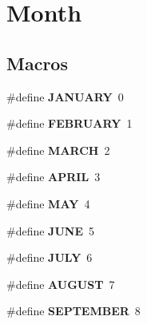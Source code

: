 \hypertarget{group___month}{\section{Month}
\label{group___month}
}
\subsection*{Macros}
\begin{DoxyCompactItemize}
\item 
\hypertarget{group___month_ga828e0d3dc63102cb9085c2a30e0401b1}{\#define {\bfseries J\-A\-N\-U\-A\-R\-Y}~0}\label{group___month_ga828e0d3dc63102cb9085c2a30e0401b1}

\item 
\hypertarget{group___month_gaa0e2011dd78d9ce4cb22f5a1c96544fb}{\#define {\bfseries F\-E\-B\-R\-U\-A\-R\-Y}~1}\label{group___month_gaa0e2011dd78d9ce4cb22f5a1c96544fb}

\item 
\hypertarget{group___month_gab3e4c116a82f8adf3ebaa8203892826b}{\#define {\bfseries M\-A\-R\-C\-H}~2}\label{group___month_gab3e4c116a82f8adf3ebaa8203892826b}

\item 
\hypertarget{group___month_gaccbe5f11839f88ac5e0f9734443e4129}{\#define {\bfseries A\-P\-R\-I\-L}~3}\label{group___month_gaccbe5f11839f88ac5e0f9734443e4129}

\item 
\hypertarget{group___month_ga51a4d4fd49a2f55c046f9206c4566d15}{\#define {\bfseries M\-A\-Y}~4}\label{group___month_ga51a4d4fd49a2f55c046f9206c4566d15}

\item 
\hypertarget{group___month_gaa2a2ed014b48b6612aa861692d9955fa}{\#define {\bfseries J\-U\-N\-E}~5}\label{group___month_gaa2a2ed014b48b6612aa861692d9955fa}

\item 
\hypertarget{group___month_ga4d78a104203d99b119cd3c167832d43f}{\#define {\bfseries J\-U\-L\-Y}~6}\label{group___month_ga4d78a104203d99b119cd3c167832d43f}

\item 
\hypertarget{group___month_gab89f2e74a43ccc379149fb8ed333d3d7}{\#define {\bfseries A\-U\-G\-U\-S\-T}~7}\label{group___month_gab89f2e74a43ccc379149fb8ed333d3d7}

\item 
\hypertarget{group___month_gadea904e818e3966b5997f1c3afc32b64}{\#define {\bfseries S\-E\-P\-T\-E\-M\-B\-E\-R}~8}\label{group___month_gadea904e818e3966b5997f1c3afc32b64}


\end{DoxyCompactItemize}
